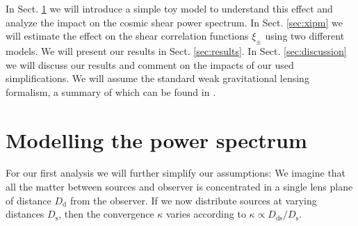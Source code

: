 \documentclass[referee]{aa} %
\renewcommand{\[}{\begin{equation}}
\renewcommand{\]}{\end{equation}}
\renewcommand{\rm}{\mathrm}
\begin{document}
In Sect. \ref{sec:modelling_single_lens} we will introduce a simple toy model to understand this effect and analyze the impact on the cosmic shear power spectrum. In Sect. \ref{sec:xipm} we will estimate the effect on the shear correlation functions $\xi_\pm$ using two different models. We will present our results in Sect. \ref{sec:results}. In Sect. \ref{sec:discussion} we will discuss our results and comment on the impacts of our used simplifications. We will assume the standard weak gravitational lensing formalism, a summary of which can be found in \citet{2001PhR...340..291B}.


\section{Modelling the power spectrum}
\label{sec:modelling_single_lens}
For our first analysis we will further simplify our assumptions: We imagine that all the matter between sources and observer is concentrated in a single lens plane of distance $D_{\rm d}$ from the observer. If we now distribute sources at varying distances $D_{\rm s}$, then the convergence $\kappa$ varies according to $\kappa \propto D_{\rm{ds}}/D_{\rm s}$. 

\end{document}
